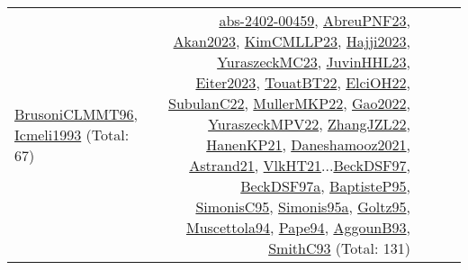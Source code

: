 {\begin{longtable}{p{3cm}r>{\raggedright\arraybackslash}p{6cm}>{\raggedright\arraybackslash}p{6cm}>{\raggedright\arraybackslash}p{8cm}}
\hyperref[detail:BrusoniCLMMT96]{BrusoniCLMMT96}, \hyperref[detail:Icmeli1993]{Icmeli1993} (Total: 67) & \hyperref[detail:abs-2402-00459]{abs-2402-00459}, \hyperref[detail:AbreuPNF23]{AbreuPNF23}, \hyperref[detail:Akan2023]{Akan2023}, \hyperref[detail:KimCMLLP23]{KimCMLLP23}, \hyperref[detail:Hajji2023]{Hajji2023}, \hyperref[detail:YuraszeckMC23]{YuraszeckMC23}, \hyperref[detail:JuvinHHL23]{JuvinHHL23}, \hyperref[detail:Eiter2023]{Eiter2023}, \hyperref[detail:TouatBT22]{TouatBT22}, \hyperref[detail:ElciOH22]{ElciOH22}, \hyperref[detail:SubulanC22]{SubulanC22}, \hyperref[detail:MullerMKP22]{MullerMKP22}, \hyperref[detail:Gao2022]{Gao2022}, \hyperref[detail:YuraszeckMPV22]{YuraszeckMPV22}, \hyperref[detail:ZhangJZL22]{ZhangJZL22}, \hyperref[detail:HanenKP21]{HanenKP21}, \hyperref[detail:Daneshamooz2021]{Daneshamooz2021}, \hyperref[detail:Astrand21]{Astrand21}, \hyperref[detail:VlkHT21]{VlkHT21}...\hyperref[detail:BeckDSF97]{BeckDSF97}, \hyperref[detail:BeckDSF97a]{BeckDSF97a}, \hyperref[detail:BaptisteP95]{BaptisteP95}, \hyperref[detail:SimonisC95]{SimonisC95}, \hyperref[detail:Simonis95a]{Simonis95a}, \hyperref[detail:Goltz95]{Goltz95}, \hyperref[detail:Muscettola94]{Muscettola94}, \hyperref[detail:Pape94]{Pape94}, \hyperref[detail:AggounB93]{AggounB93}, \hyperref[detail:SmithC93]{SmithC93} (Total: 131)\\

\end{longtable}}

